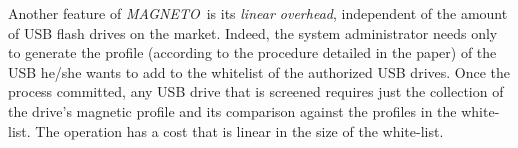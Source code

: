 \documentclass[acmsmall, authorversion]{acmart}
\newcommand{\sol}{\emph{MAGNETO}}
\begin{document}
\noindent
Another feature of \sol\ is its \emph{linear overhead}, independent of the amount of USB flash drives on the market. 
Indeed, the system administrator needs only to 
generate the profile (according to the procedure detailed in the paper) of the USB he/she wants to add to the whitelist of the authorized USB drives. Once the process committed, any USB drive that is screened requires just the collection of the drive's magnetic profile and its comparison against the profiles in the white-list. The operation has a cost that is linear in the size of the white-list.
\end{document}
